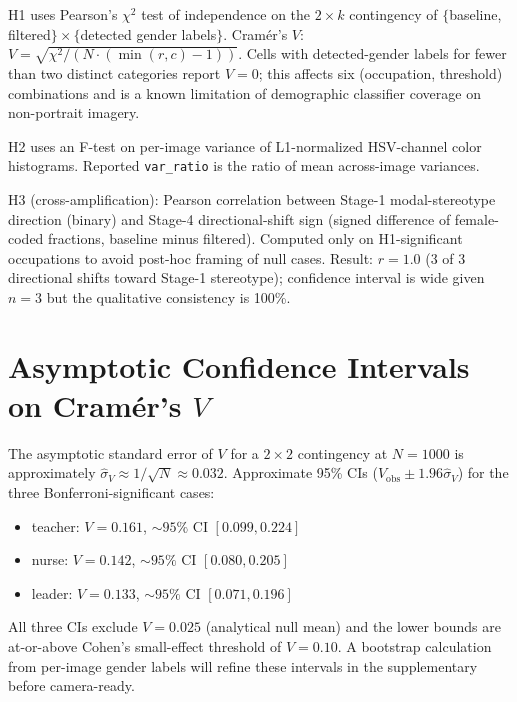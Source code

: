 \documentclass[manuscript, nonacm, screen, review]{acmart}
\begin{document}
H1 uses Pearson's $\chi^2$ test of independence on the $2\!\times\!k$ contingency of $\{$baseline, filtered$\}\!\times\!\{$detected gender labels$\}$. Cramér's $V$: $V\!=\!\sqrt{\chi^2/(N\cdot(\min(r,c)\!-\!1))}$. Cells with detected-gender labels for fewer than two distinct categories report $V\!=\!0$; this affects six (occupation, threshold) combinations and is a known limitation of demographic classifier coverage on non-portrait imagery.

H2 uses an F-test on per-image variance of L1-normalized HSV-channel color histograms. Reported \texttt{var\_ratio} is the ratio of mean across-image variances.

H3 (cross-amplification): Pearson correlation between Stage-1 modal-stereotype direction (binary) and Stage-4 directional-shift sign (signed difference of female-coded fractions, baseline minus filtered). Computed only on H1-significant occupations to avoid post-hoc framing of null cases. Result: $r\!=\!1.0$ (3 of 3 directional shifts toward Stage-1 stereotype); confidence interval is wide given $n\!=\!3$ but the qualitative consistency is 100\%.

\section{Asymptotic Confidence Intervals on Cramér's $V$}

The asymptotic standard error of $V$ for a $2\!\times\!2$ contingency at $N\!=\!1000$ is approximately $\hat{\sigma}_V \approx 1/\sqrt{N} \approx 0.032$. Approximate 95\% CIs ($V_{\text{obs}} \pm 1.96 \hat\sigma_V$) for the three Bonferroni-significant cases:

\begin{itemize}\itemsep0pt
\item teacher: $V\!=\!0.161$, $\sim\!95\%$ CI $[0.099, 0.224]$
\item nurse: $V\!=\!0.142$, $\sim\!95\%$ CI $[0.080, 0.205]$
\item leader: $V\!=\!0.133$, $\sim\!95\%$ CI $[0.071, 0.196]$
\end{itemize}

All three CIs exclude $V\!=\!0.025$ (analytical null mean) and the lower bounds are at-or-above Cohen's small-effect threshold of $V\!=\!0.10$. A bootstrap calculation from per-image gender labels will refine these intervals in the supplementary before camera-ready.
\end{document}
